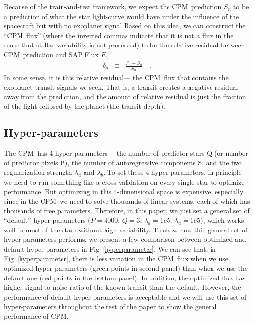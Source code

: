 \documentclass[12pt, preprint]{aastex}
\newcommand{\name}{CPM}
\begin{document}
Because of the train-and-test framework,  
  we expect the \name\ prediction $S_{n}$ to be a prediction of
  what the star light-curve would have under the influence of the spacecraft but with no exoplanet signal 
Based on this idea, 
  we can construct the ``\name\ flux'' 
  (where the inverted commas indicate that it is not a flux in the sense that stellar variability is not preserved) 
  to be the relative residual between \name\ prediction and SAP Flux $F_{n}$
\begin{eqnarray}
\delta_{n}&\equiv&\frac{F_{n} - S_{n}}{S_{n}}
\quad .
\end{eqnarray} 
In some sense, it is this relative residual--- the \name\ flux that contains the exoplanet transit signals we seek. 
That is, a transit creates a negative residual away from the prediction, 
  and the amount of relative residual is just the fraction of the light eclipsed by the planet (the transit depth). 

\subsection{Hyper-parameters}
The \name\ has 4 hyper-parameters--- 
  the number of predictor stars Q (or number of predictor pixels P), 
  the number of autoregressive components S, 
  and the two regularization strength $\lambda_{a}$ and $\lambda_{b}$.
To set these 4 hyper-parameters, 
  in principle we need to run something like a cross-validation on every single star to optimize performance.
But optimizing in this 4-dimensional space is expensive, 
  especially since in the \name\ we need to solve thousands of linear systems, 
  each of which has thousands of free parameters. 
Therefore, in this paper, 
  we just set a general set of ``default'' hyper-parameters ($P=4000$, $Q=3$, $\lambda_a=1e5$, $\lambda_a=1e5$), 
  which works well in most of the stars without high variability. 
To show how this general set of hyper-parameters performs, 
  we present a few comparison between optimized and default hyper-parameters 
  in Fig~\ref{hyperparameter}.
We can see that, in Fig~\ref{hyperparameter}, 
  there is less variation in the \name\ flux 
  when we use optimized hyper-parameters (green points in second panel) 
  than when we use the default one (red points in the bottom panel). 
In addition, the optimized flux has higher signal to noise ratio of the known transit than the default. 
However, the performance of default hyper-parameters is acceptable 
  and we will use this set of hyper-parameters throughout the rest of the paper 
  to show the general performance of \name. 
\end{document}
